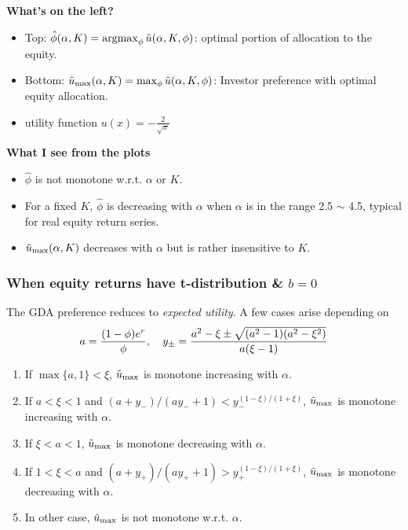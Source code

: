 \documentclass{beamer}
\begin{document}
\begin{frame}
\begin{minipage}[t]{0.4\linewidth}
\begin{figure}[htb!]
\begin{minipage}{\linewidth}
      \end{minipage}
    \end{figure}
  \end{minipage}\hfill
  \begin{minipage}[t]{0.6\linewidth}
    \begin{footnotesize}
      \textcolor[HTML]{990033}{\bf What's on the left?}
      \begin{itemize}
      \item Top: $\hat \phi(\alpha, K) = \operatorname*{argmax}_{\phi} \tilde u(\alpha, K, \phi)$:
        optimal portion of allocation to the equity.
      \item Bottom: $\tilde u_{\rm max}(\alpha, K) = \max_{\phi} \tilde
        u(\alpha, K, \phi)$:
        Investor preference with optimal equity allocation.
      \item utility function $u(x) = -\frac{2}{\sqrt x}$
      \end{itemize}
      
      \textcolor[HTML]{990033}{\bf What I see from the plots}
      \begin{itemize}
      \item $\hat \phi$ is not monotone w.r.t. $\alpha$ or $K$.
      \item For a fixed $K$, $\hat \phi$ is decreasing with $\alpha$
        when $\alpha$ is in the range 2.5 $\sim$ 4.5, typical for real
        equity return series.
      \item $\tilde u_{\rm max}(\alpha, K)$ decreases with $\alpha$ 
        but is rather insensitive to $K$.
      \end{itemize}
    \end{footnotesize}
  \end{minipage}
\end{frame}

\begin{frame}
  \frametitle{When equity returns have t-distribution \& $b = 0$}
  The GDA preference reduces to {\em expected utility}. A few cases
  arise depending on
  \[
  a = {
    (1 - \phi) e^r
    \over
    \phi
  }, \quad
  y_\pm = {
    a^2 - \xi \pm \sqrt{(a^2 - 1) (a^2 - \xi^2)}
    \over
    a (\xi - 1)
  }
  \]
\begin{enumerate}
\item If $\max\{a, 1\} < \xi$, $\tilde u_{\rm max}$ is
  monotone increasing with $\alpha$.
\item If $a < \xi < 1$ and $(a + y_-)/(a y_- + 1) <
  y_-^{(1-\xi)/(1+\xi)}$, $\tilde u_{\rm max}$ is monotone
  increasing with $\alpha$.
\item If $\xi < a < 1$, $\tilde u_{\rm max}$ is monotone
  decreasing with $\alpha$.
\item If $1 < \xi < a$ and $(a + y_+)/(a y_+ + 1) >
  y_+^{(1-\xi)/(1+\xi)}$, $\tilde u_{\rm max}$ is monotone
  decreasing with $\alpha$.
\item In other case, $\tilde u_{\rm max}$ is not monotone
  w.r.t. $\alpha$.
\end{enumerate}
\end{frame}
\end{document}
